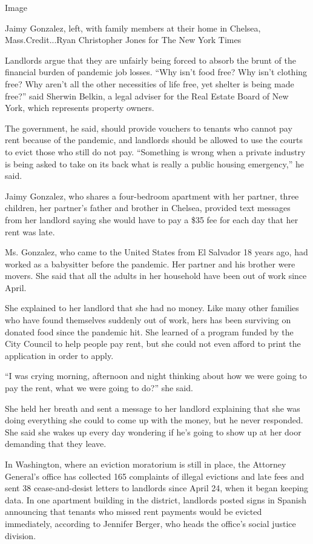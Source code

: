 Image

Jaimy Gonzalez, left, with family members at their home in Chelsea,
Mass.Credit...Ryan Christopher Jones for The New York Times

Landlords argue that they are unfairly being forced to absorb the brunt
of the financial burden of pandemic job losses. ``Why isn't food free?
Why isn't clothing free? Why aren't all the other necessities of life
free, yet shelter is being made free?'' said Sherwin Belkin, a legal
adviser for the Real Estate Board of New York, which represents property
owners.

The government, he said, should provide vouchers to tenants who cannot
pay rent because of the pandemic, and landlords should be allowed to use
the courts to evict those who still do not pay. ``Something is wrong
when a private industry is being asked to take on its back what is
really a public housing emergency,'' he said.

Jaimy Gonzalez, who shares a four-bedroom apartment with her partner,
three children, her partner's father and brother in Chelsea, provided
text messages from her landlord saying she would have to pay a \$35 fee
for each day that her rent was late.

Ms. Gonzalez, who came to the United States from El Salvador 18 years
ago, had worked as a babysitter before the pandemic. Her partner and his
brother were movers. She said that all the adults in her household have
been out of work since April.

She explained to her landlord that she had no money. Like many other
families who have found themselves suddenly out of work, hers has been
surviving on donated food since the pandemic hit. She learned of a
program funded by the City Council to help people pay rent, but she
could not even afford to print the application in order to apply.

``I was crying morning, afternoon and night thinking about how we were
going to pay the rent, what we were going to do?'' she said.

She held her breath and sent a message to her landlord explaining that
she was doing everything she could to come up with the money, but he
never responded. She said she wakes up every day wondering if he's going
to show up at her door demanding that they leave.

In Washington, where an eviction moratorium is still in place, the
Attorney General's office has collected 165 complaints of illegal
evictions and late fees and sent 38 cease-and-desist letters to
landlords since April 24, when it began keeping data. In one apartment
building in the district, landlords posted signs in Spanish announcing
that tenants who missed rent payments would be evicted immediately,
according to Jennifer Berger, who heads the office's social justice
division.

